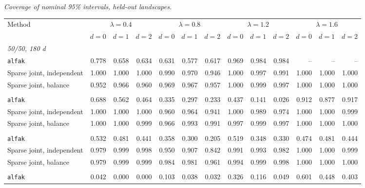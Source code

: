 \noindent\textit{Coverage of nominal 95\% intervals, held-out landscapes.}
\begin{center}
\scriptsize
\setlength{\tabcolsep}{2.5pt}
\begin{tabular}{l*{12}{r}}
\toprule
Method & \multicolumn{3}{c}{$\lambda=0.4$} & \multicolumn{3}{c}{$\lambda=0.8$} & \multicolumn{3}{c}{$\lambda=1.2$} & \multicolumn{3}{c}{$\lambda=1.6$} \\
\cmidrule(lr){2-4}\cmidrule(lr){5-7}\cmidrule(lr){8-10}\cmidrule(lr){11-13}
 & $d=0$ & $d=1$ & $d=2$ & $d=0$ & $d=1$ & $d=2$ & $d=0$ & $d=1$ & $d=2$ & $d=0$ & $d=1$ & $d=2$ \\
\midrule
\multicolumn{13}{l}{\textit{50/50, 180 d}} \\
\quad \texttt{alfak} & 0.778 & 0.658 & 0.634 & 0.631 & 0.577 & 0.617 & 0.969 & 0.984 & 0.984 & -- & -- & -- \\
\quad Sparse joint, independent & 1.000 & 1.000 & 1.000 & 0.990 & 0.970 & 0.946 & 1.000 & 0.997 & 0.991 & 1.000 & 1.000 & 1.000 \\
\quad Sparse joint, balance & 0.952 & 0.966 & 0.960 & 0.969 & 0.967 & 0.957 & 1.000 & 0.999 & 0.997 & 1.000 & 1.000 & 1.000 \\
\addlinespace[2pt]
\multicolumn{13}{l}{\textit{200/200, 180 d}} \\
\quad \texttt{alfak} & 0.688 & 0.562 & 0.464 & 0.335 & 0.297 & 0.233 & 0.437 & 0.141 & 0.026 & 0.912 & 0.877 & 0.917 \\
\quad Sparse joint, independent & 1.000 & 1.000 & 1.000 & 0.960 & 0.964 & 0.941 & 1.000 & 0.989 & 0.974 & 1.000 & 1.000 & 0.999 \\
\quad Sparse joint, balance & 1.000 & 1.000 & 0.999 & 0.966 & 0.993 & 0.991 & 0.997 & 0.999 & 0.997 & 1.000 & 1.000 & 1.000 \\
\addlinespace[2pt]
\multicolumn{13}{l}{\textit{200/200, 360 d}} \\
\quad \texttt{alfak} & 0.532 & 0.481 & 0.441 & 0.358 & 0.300 & 0.205 & 0.519 & 0.348 & 0.330 & 0.474 & 0.481 & 0.444 \\
\quad Sparse joint, independent & 0.979 & 0.999 & 0.998 & 0.950 & 0.907 & 0.842 & 0.991 & 0.993 & 0.982 & 1.000 & 1.000 & 0.999 \\
\quad Sparse joint, balance & 0.979 & 0.999 & 0.999 & 0.984 & 0.981 & 0.961 & 0.994 & 0.999 & 0.998 & 1.000 & 1.000 & 1.000 \\
\addlinespace[2pt]
\multicolumn{13}{l}{\textit{500/700, 360 d}} \\
\quad \texttt{alfak} & 0.042 & 0.000 & 0.000 & 0.103 & 0.038 & 0.032 & 0.326 & 0.116 & 0.049 & 0.601 & 0.448 & 0.403 \\

\end{tabular}
\end{center}

